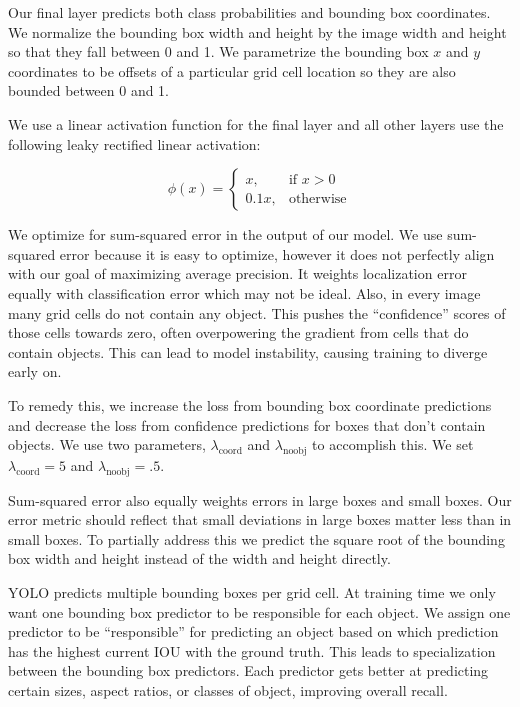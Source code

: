 Our final layer predicts both class probabilities and bounding box coordinates. We normalize the bounding box width and height by the image width and height so that they fall between 0 and 1. We parametrize the bounding box $x$ and $y$ coordinates to be offsets of a particular grid cell location so they are also bounded between 0 and 1.

We use a linear activation function for the final layer and all other layers use the following leaky rectified linear activation:

\begin{equation}
\phi(x) =
\begin{cases}
 x, & \text{if } x > 0\\
 0.1x, & \text{otherwise}
 \end{cases}
\end{equation}

We optimize for sum-squared error in the output of our model. We use sum-squared error because it is easy to optimize, however it does not perfectly align with our goal of maximizing average precision. It weights localization error equally with classification error which may not be ideal. Also, in every image many grid cells do not contain any object. This pushes the ``confidence'' scores of those cells towards zero, often overpowering the gradient from cells that do contain objects. This can lead to model instability, causing training to diverge early on.

To remedy this, we increase the loss from bounding box coordinate predictions and decrease the loss from confidence predictions for boxes that don't contain objects. We use two parameters, $\lambda_\textrm{coord}$ and $\lambda_\textrm{noobj}$ to accomplish this. We set $\lambda_\textrm{coord} = 5$ and $\lambda_\textrm{noobj} = .5$.

Sum-squared error also equally weights errors in large boxes and small boxes. Our error metric should reflect that small deviations in large boxes matter less than in small boxes. To partially address this we predict the square root of the bounding box width and height instead of the width and height directly. 

YOLO predicts multiple bounding boxes per grid cell. At training time we only want one bounding box predictor to be responsible for each object. We assign one predictor to be ``responsible'' for predicting an object based on which prediction has the highest current IOU with the ground truth. This leads to specialization between the bounding box predictors. Each predictor gets better at predicting certain sizes, aspect ratios, or classes of object, improving overall recall.

